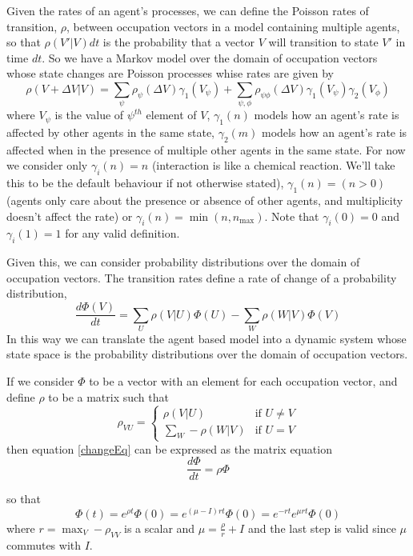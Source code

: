 \documentclass[a4paper]{article}
\begin{document}
Given the rates of an agent's processes, we can define the Poisson rates of transition, $\rho$, between occupation vectors in a model containing multiple agents, so that $\rho(V'|V)dt$ is the probability that a vector $V$ will transition to state $V'$ in time $dt$. So we have a Markov model over the domain of occupation vectors whose state changes are Poisson processes whise rates are given by 
\begin{equation}
\rho(V + \Delta V|V) = \sum_{\psi}  \rho_\psi(\Delta V) \gamma_1(V_\psi) + \sum_{\psi,\phi}  \rho_{\psi\phi}(\Delta V) \gamma_1(V_\psi)\gamma_2(V_\phi)
\label{rateEq}
\end{equation}
where $V_\psi$ is the value of $\psi^{th}$ element of $V$, $\gamma_1(n)$ models how an agent's rate is affected by other agents in the same state, $\gamma_2(m)$ models how an agent's rate is affected when in the presence of multiple other agents in the same state. For now we consider only $\gamma_i(n) = n$ (interaction is like a chemical reaction. We'll take this to be the default behaviour if not otherwise stated), $\gamma_1(n) = (n>0)$ (agents only care about the presence or absence of other agents, and multiplicity doesn't affect the rate) or $\gamma_i(n) = \min(n,n_{\text{max}})$. Note that $\gamma_i(0) = 0$ and $\gamma_i(1) = 1$ for any valid definition.

Given this, we can consider probability distributions over the domain of occupation vectors. The transition rates define a rate of change of a probability distribution,
\begin{equation}
\frac{d\Phi(V)}{dt} = \sum_{U} \rho(V|U)\Phi(U) - \sum_W \rho(W|V)\Phi(V)
\label{changeEq}
\end{equation}
In this way we can translate the agent based model into a dynamic system whose state space is the probability distributions over the domain of occupation vectors.

If we consider $\Phi$ to be a vector with an element for each occupation vector, and define $\rho$ to be a matrix such that
\[
\rho_{VU} = 
\begin{cases}
	\rho(V|U) & \text{if } U \ne V\\
	\sum_{W} -\rho(W|V) & \text{if } U = V
\end{cases}
\] 
then equation \ref{changeEq} can be expressed as the matrix equation
\begin{equation}
	\frac{d\Phi}{dt} = \rho\Phi
	\label{expChangeEq}
\end{equation}

so that
\[
\Phi(t) = e^{\rho t}\Phi(0) = e^{(\mu - I)rt}\Phi(0) = e^{-rt}e^{\mu rt}\Phi(0)
\]
where $r = \max_V -\rho_{VV}$ is a scalar and $\mu = \frac{\rho}{r} + I$ and the last step is valid since $\mu$ commutes with $I$.
\end{document}
